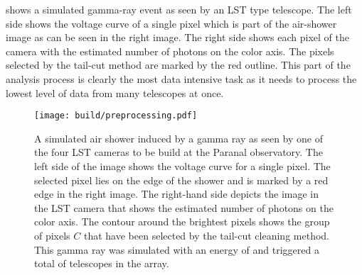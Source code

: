  shows a simulated gamma-ray event as seen by an LST type telescope. 
The left side shows the voltage curve of a single pixel which is part of the air-shower image as can be seen in the right image. The right side shows 
each pixel of the camera with the estimated number of photons on the color axis. The pixels selected by the tail-cut method are marked by the red outline.
This part of the analysis process is clearly the most data intensive task as it needs to process the lowest level of data from many
telescopes at once. 

\begin{figure}
    \centering
    \texttt{[image: build/preprocessing.pdf]}
    \caption[Preprocessing of CTA data]{A simulated air shower induced by a gamma ray as seen by one of the four LST cameras to be build
    at the Paranal observatory. 
    The left side of the image shows the voltage curve for a single pixel. The selected pixel lies on the edge of the 
    shower and is marked by a red edge in the right image. The right-hand side depicts the 
    image in the LST camera that shows the estimated number of photons on the color axis.
    The contour around the brightest pixels shows the group of pixels $C$ that have been selected by the tail-cut cleaning method.
    This gamma ray was simulated with an energy of  and triggered a total of 
    telescopes in the array. 
    }
    \label{fig:preprocess}
\end{figure}


